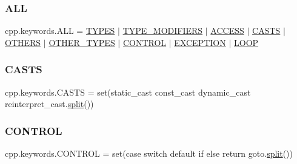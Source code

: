 \subsubsection{\texorpdfstring{ALL}{ALL}}
{\footnotesize\ttfamily cpp.\+keywords.\+A\+LL = \mbox{\hyperlink{namespacecpp_1_1keywords_a56fd5baf357970548e1ec366edfc2c13}{T\+Y\+P\+ES}} $\vert$ \mbox{\hyperlink{namespacecpp_1_1keywords_af9282ce418d6b4b43dca5ed574caedd7}{T\+Y\+P\+E\+\_\+\+M\+O\+D\+I\+F\+I\+E\+RS}} $\vert$ \mbox{\hyperlink{namespacecpp_1_1keywords_a786f41bbea982641425c819d10bb2064}{A\+C\+C\+E\+SS}} $\vert$ \mbox{\hyperlink{namespacecpp_1_1keywords_aeba38dc38e188040f4ec44ba05092e7f}{C\+A\+S\+TS}} $\vert$ \mbox{\hyperlink{namespacecpp_1_1keywords_a15fe231fbad145538b73892804898809}{O\+T\+H\+E\+RS}} $\vert$ \mbox{\hyperlink{namespacecpp_1_1keywords_aa86a5e35a3ace14022a5ca1b91baf207}{O\+T\+H\+E\+R\+\_\+\+T\+Y\+P\+ES}} $\vert$ \mbox{\hyperlink{namespacecpp_1_1keywords_a374dfe9c96681079802ba4724287b8ff}{C\+O\+N\+T\+R\+OL}} $\vert$ \mbox{\hyperlink{namespacecpp_1_1keywords_a2665fb8a25a4dae03fa5d3dc975c537c}{E\+X\+C\+E\+P\+T\+I\+ON}} $\vert$ \mbox{\hyperlink{namespacecpp_1_1keywords_af0164c05398a2291487b76414102d555}{L\+O\+OP}}}

\mbox{\label{namespacecpp_1_1keywords_aeba38dc38e188040f4ec44ba05092e7f}} 
\subsubsection{\texorpdfstring{CASTS}{CASTS}}
{\footnotesize\ttfamily cpp.\+keywords.\+C\+A\+S\+TS = set(\textquotesingle{}static\+\_\+cast const\+\_\+cast dynamic\+\_\+cast reinterpret\+\_\+cast\textquotesingle{}.\mbox{\hyperlink{_input_8h_aec2fd8cd9140a1b535dc54a924396f40}{split}}())}

\mbox{\label{namespacecpp_1_1keywords_a374dfe9c96681079802ba4724287b8ff}} 
\subsubsection{\texorpdfstring{CONTROL}{CONTROL}}
{\footnotesize\ttfamily cpp.\+keywords.\+C\+O\+N\+T\+R\+OL = set(\textquotesingle{}case switch default if else return goto\textquotesingle{}.\mbox{\hyperlink{_input_8h_aec2fd8cd9140a1b535dc54a924396f40}{split}}())}

